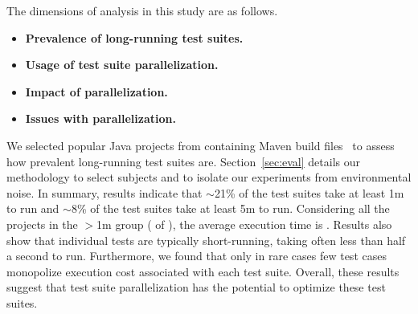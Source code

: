 The dimensions of analysis in this study are as follows.

\begin{itemize}
\item \textbf{Prevalence of long-running test suites.}
\item \textbf{Usage of test suite parallelization.}  
\item \textbf{Impact of parallelization.}
\item \textbf{Issues with parallelization.}    
\end{itemize}  




We selected \numSubjs{} popular Java projects from \github{}
containing Maven build files~\cite{maven} to assess how prevalent
long-running test suites are.  Section~\ref{sec:eval} details our
methodology to select subjects and to isolate our experiments from
environmental noise.  In summary, results indicate that $\sim$21\% of
the test suites take at least 1m to run and $\sim$8\% of the test
suites take at least 5m to run.  Considering all the \numMedLong{}
projects in the $>$1m group (\percentMedLongRunning{} of
\numSubjs{}), the
average execution time is \averageMedLongRunning{}.  Results also show
that individual tests are typically short-running, taking often less
than half a second to run.  Furthermore, we found that only in rare
cases few test cases monopolize execution cost associated with each
test suite.  Overall, these results suggest that test suite
parallelization has the potential to optimize these test suites.

